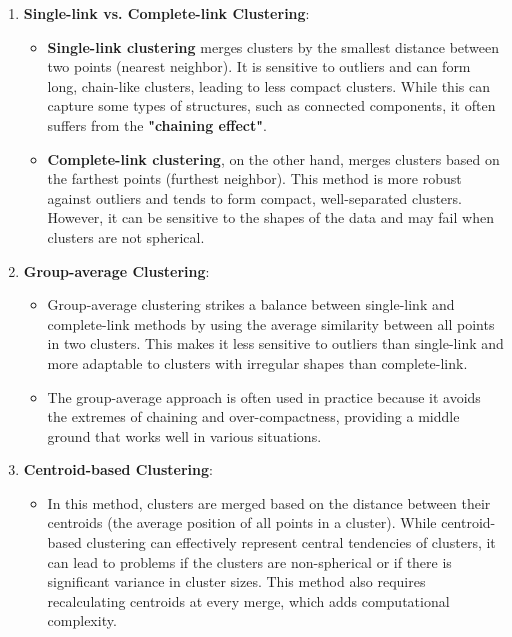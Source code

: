\documentclass{article}
\begin{document}
\begin{enumerate}
\begin{enumerate}
    \item \textbf{Single-link vs. Complete-link Clustering}:
    \begin{itemize}
        \item \textbf{Single-link clustering} merges clusters by the smallest distance between two points (nearest neighbor). It is sensitive to outliers and can form long, chain-like clusters, leading to less compact clusters. While this can capture some types of structures, such as connected components, it often suffers from the \textbf{"chaining effect"}.
        \item \textbf{Complete-link clustering}, on the other hand, merges clusters based on the farthest points (furthest neighbor). This method is more robust against outliers and tends to form compact, well-separated clusters. However, it can be sensitive to the shapes of the data and may fail when clusters are not spherical.
    \end{itemize}

    \item \textbf{Group-average Clustering}:
    \begin{itemize}
        \item Group-average clustering strikes a balance between single-link and complete-link methods by using the average similarity between all points in two clusters. This makes it less sensitive to outliers than single-link and more adaptable to clusters with irregular shapes than complete-link.
        \item The group-average approach is often used in practice because it avoids the extremes of chaining and over-compactness, providing a middle ground that works well in various situations.
    \end{itemize}

    \item \textbf{Centroid-based Clustering}:
    \begin{itemize}
        \item In this method, clusters are merged based on the distance between their centroids (the average position of all points in a cluster). While centroid-based clustering can effectively represent central tendencies of clusters, it can lead to problems if the clusters are non-spherical or if there is significant variance in cluster sizes. This method also requires recalculating centroids at every merge, which adds computational complexity.
    \end{itemize}


\end{enumerate}
\end{enumerate}
\end{document}
